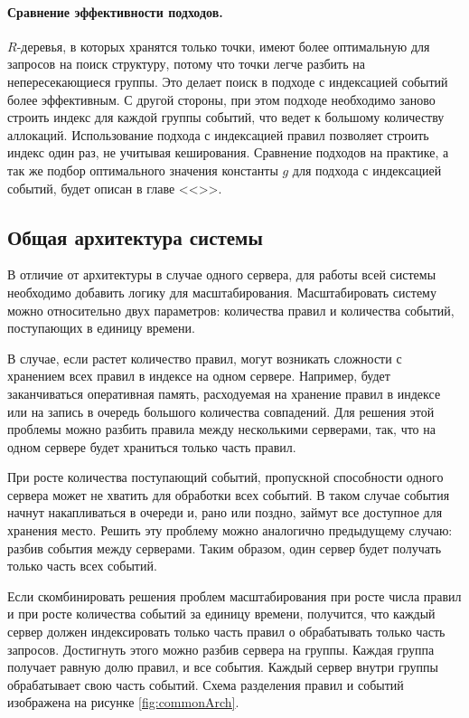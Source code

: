 \documentclass[14pt]{article}
\begin{document}
\paragraph{Сравнение эффективности подходов.} $R$-деревья, в которых хранятся только точки, имеют более оптимальную для запросов на поиск структуру, потому что точки легче разбить на непересекающиеся группы. Это делает поиск в подходе с индексацией событий более эффективным. С другой стороны, при этом подходе необходимо заново строить индекс для каждой группы событий, что ведет к большому количеству аллокаций. Использование подхода с индексацией правил позволяет строить индекс один раз, не учитывая кеширования. Сравнение подходов на практике, а так же подбор оптимального значения константы $g$ для подхода с индексацией событий, будет описан в главе <<>>.

\subsection{Общая архитектура системы}
\label{section:commonArch}
В отличие от архитектуры в случае одного сервера, для работы всей системы необходимо добавить логику для масштабирования. Масштабировать систему можно относительно двух параметров: количества правил и количества событий, поступающих в единицу времени.

В случае, если растет количество правил, могут возникать сложности с хранением всех правил в индексе на одном сервере. Например, будет заканчиваться оперативная память, расходуемая на хранение правил в индексе или на запись в очередь большого количества совпадений. Для решения этой проблемы можно разбить правила между несколькими серверами, так, что на одном сервере будет храниться только часть правил.

При росте количества поступающий событий, пропускной способности одного сервера может не хватить для обработки всех событий. В таком случае события начнут накапливаться в очереди и, рано или поздно, займут все доступное для хранения место. Решить эту проблему можно аналогично предыдущему случаю: разбив события между серверами. Таким образом, один сервер будет получать только часть всех событий.

Если скомбинировать решения проблем масштабирования при росте числа правил и при росте количества событий за единицу времени, получится, что каждый сервер должен индексировать только часть правил о обрабатывать только часть запросов. Достигнуть этого можно разбив сервера на группы. Каждая группа получает равную долю правил, и все события. Каждый сервер внутри группы обрабатывает свою часть событий. Схема разделения правил и событий изображена на рисунке \ref{fig:commonArch}.
\end{document}
